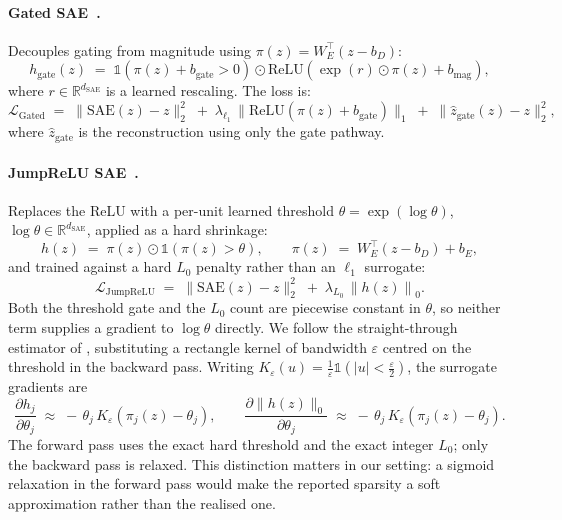  
\paragraph{Gated SAE~\citep{rajamanoharan2024improving}.}
Decouples gating from magnitude using $\pi(z) = W_E^{\top}(z - b_D)$:
\begin{equation}
h_{\mathrm{gate}}(z)
\;=\;
\mathbb{1}\!\left(\pi(z) + b_{\mathrm{gate}} > 0\right)
\odot
\mathrm{ReLU}\!\left(\exp(r)\odot\pi(z) + b_{\mathrm{mag}}\right),
\label{eq:gated-sae}
\end{equation}
where $r \in \mathbb{R}^{d_{\mathrm{SAE}}}$ is a learned rescaling. The loss is:
\begin{equation}
\mathcal{L}_{\mathrm{Gated}}
\;=\;
\|\mathrm{SAE}(z) - z\|_2^2
\;+\;
\lambda_{\ell_1}\,\|\mathrm{ReLU}(\pi(z) + b_{\mathrm{gate}})\|_1
\;+\;
\|\hat{z}_{\mathrm{gate}}(z) - z\|_2^2,
\label{eq:gated-loss}
\end{equation}
where $\hat{z}_{\mathrm{gate}}$ is the reconstruction using only the gate pathway.
 
\paragraph{JumpReLU SAE~\citep{rajamanoharan2024jumprelu}.}
Replaces the ReLU with a per-unit learned threshold $\theta = \exp(\log\theta)$,
$\log\theta \in \mathbb{R}^{d_{\mathrm{SAE}}}$, applied as a hard shrinkage:
\begin{equation}
h(z) \;=\; \pi(z) \odot \mathbb{1}\!\left(\pi(z) > \theta\right),
\qquad
\pi(z) \;=\; W_E^{\top}(z - b_D) + b_E ,
\label{eq:jumprelu-sae}
\end{equation}
and trained against a hard $L_0$ penalty rather than an $\ell_1$ surrogate:
\begin{equation}
\mathcal{L}_{\mathrm{JumpReLU}}
\;=\;
\|\mathrm{SAE}(z) - z\|_2^2
\;+\;
\lambda_{L_0}\,\left\|h(z)\right\|_0 .
\label{eq:jumprelu-loss}
\end{equation}
Both the threshold gate and the $L_0$ count are piecewise constant in $\theta$, so
neither term supplies a gradient to $\log\theta$ directly. We follow the
straight-through estimator of \citet{rajamanoharan2024jumprelu}, substituting a
rectangle kernel of bandwidth $\varepsilon$ centred on the threshold in the backward
pass. Writing $K_\varepsilon(u) = \tfrac{1}{\varepsilon}\mathbb{1}(|u| < \tfrac{\varepsilon}{2})$,
the surrogate gradients are
\begin{equation}
\frac{\partial h_j}{\partial \theta_j}
\;\approx\;
-\,\theta_j\, K_\varepsilon\!\left(\pi_j(z) - \theta_j\right),
\qquad
\frac{\partial \|h(z)\|_0}{\partial \theta_j}
\;\approx\;
-\,\theta_j\, K_\varepsilon\!\left(\pi_j(z) - \theta_j\right).
\label{eq:jumprelu-ste}
\end{equation}
The forward pass uses the exact hard threshold and the exact integer $L_0$; only the
backward pass is relaxed. This distinction matters in our setting: a sigmoid relaxation
in the forward pass would make the reported sparsity a soft approximation rather than
the realised one.

